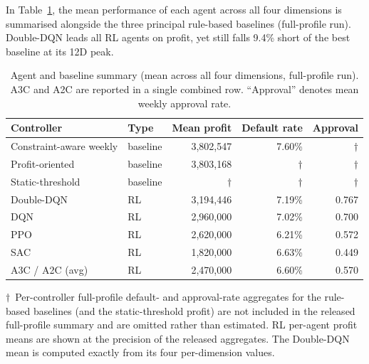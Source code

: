 \documentclass[preprint,review,authoryear,12pt]{elsarticle}
\begin{document}
In Table~\ref{tab:agent-summary}, the mean performance of each agent across all four
dimensions is summarised alongside the three principal rule-based baselines
(full-profile run). Double-DQN leads all RL agents on profit, yet still falls 9.4\% short
of the best baseline at its 12D peak.

\begin{table}[t]
    \centering
    \small
    \caption{Agent and baseline summary (mean across all four dimensions, full-profile
        run). A3C and A2C are reported in a single combined row. ``Approval'' denotes mean
        weekly approval rate.}
    \label{tab:agent-summary}
    \begin{tabular}{l l r r r}
        \toprule
        Controller              & Type     & Mean profit   & Default rate & Approval  \\
        \midrule
        Constraint-aware weekly & baseline & 3{,}802{,}547 & 7.60\%       & $\dagger$ \\ %
        Profit-oriented         & baseline & 3{,}803{,}168 & $\dagger$    & $\dagger$ \\ %
        Static-threshold        & baseline & $\dagger$     & $\dagger$    & $\dagger$ \\ %
        \midrule
        Double-DQN              & RL       & 3{,}194{,}446 & 7.19\%       & 0.767     \\
        DQN                     & RL       & 2{,}960{,}000 & 7.02\%       & 0.700     \\
        PPO                     & RL       & 2{,}620{,}000 & 6.21\%       & 0.572     \\
        SAC                     & RL       & 1{,}820{,}000 & 6.63\%       & 0.449     \\
        A3C / A2C (avg)         & RL       & 2{,}470{,}000 & 6.60\%       & 0.570     \\
        \bottomrule
    \end{tabular}\par
    \vspace{2pt}
    {\footnotesize $\dagger$~Per-controller full-profile default- and approval-rate
        aggregates for the rule-based baselines (and the static-threshold profit) are not
        included in the released full-profile summary and are omitted rather than estimated.
        RL per-agent profit means are shown at the precision of the released aggregates.
        The Double-DQN mean is computed exactly from its four per-dimension values.}
\end{table}
\end{document}
